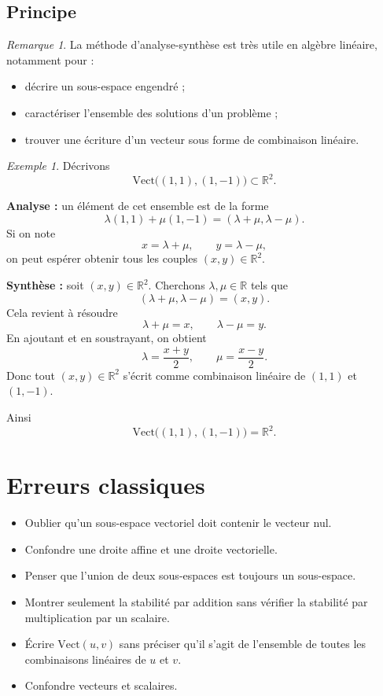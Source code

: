 \documentclass[11pt,a4paper]{article}
\theoremstyle{remark}
\newtheorem{remarque}[definition]{Remarque}
\newtheorem{exemple}[definition]{Exemple}
\newcommand{\R}{\mathbb{R}}
\begin{document}
\subsection{Principe}

\begin{remarque}
La méthode d’analyse-synthèse est très utile en algèbre linéaire, notamment pour :
\begin{itemize}
    \item décrire un sous-espace engendré ;
    \item caractériser l’ensemble des solutions d’un problème ;
    \item trouver une écriture d’un vecteur sous forme de combinaison linéaire.
\end{itemize}
\end{remarque}

\begin{exemple}
Décrivons
\[
\mathrm{Vect}\big((1,1),(1,-1)\big)\subset \R^2.
\]

\textbf{Analyse :} un élément de cet ensemble est de la forme
\[
\lambda(1,1)+\mu(1,-1)=(\lambda+\mu,\lambda-\mu).
\]
Si on note
\[
x=\lambda+\mu,\qquad y=\lambda-\mu,
\]
on peut espérer obtenir tous les couples \((x,y)\in\R^2\).

\textbf{Synthèse :} soit \((x,y)\in\R^2\). Cherchons \(\lambda,\mu\in\R\) tels que
\[
(\lambda+\mu,\lambda-\mu)=(x,y).
\]
Cela revient à résoudre
\[
\lambda+\mu=x,\qquad \lambda-\mu=y.
\]
En ajoutant et en soustrayant, on obtient
\[
\lambda=\frac{x+y}{2},\qquad \mu=\frac{x-y}{2}.
\]
Donc tout \((x,y)\in\R^2\) s’écrit comme combinaison linéaire de \((1,1)\) et \((1,-1)\).

Ainsi
\[
\mathrm{Vect}\big((1,1),(1,-1)\big)=\R^2.
\]
\end{exemple}

\section{Erreurs classiques}

\begin{itemize}
    \item Oublier qu’un sous-espace vectoriel doit contenir le vecteur nul.
    \item Confondre une droite affine et une droite vectorielle.
    \item Penser que l’union de deux sous-espaces est toujours un sous-espace.
    \item Montrer seulement la stabilité par addition sans vérifier la stabilité par multiplication par un scalaire.
    \item Écrire \(\mathrm{Vect}(u,v)\) sans préciser qu’il s’agit de l’ensemble de toutes les combinaisons linéaires de \(u\) et \(v\).
    \item Confondre vecteurs et scalaires.
\end{itemize}
\end{document}
